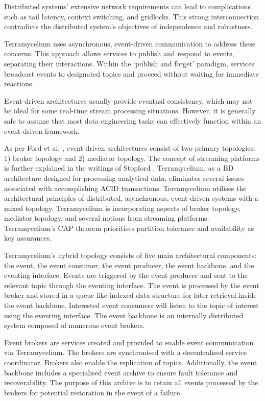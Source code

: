\documentclass{ieeeaccess}
\begin{document}
Distributed systems' extensive network requirements can lead to complications such as tail latency, context switching, and gridlocks. This strong interconnection contradicts the distributed system's objectives of independence and robustness.

Terramycelium uses asynchronous, event-driven communication to address these concerns. This approach allows services to publish and respond to events, separating their interactions. Within the `publish and forget' paradigm, services broadcast events to designated topics and proceed without waiting for immediate reactions.

Event-driven architectures usually provide eventual consistency, which may not be ideal for some real-time stream processing situations. However, it is generally safe to assume that most data engineering tasks can effectively function within an event-driven framework.

As per Ford et al. \cite{Ford2021SoftwareArchitecture}, event-driven architectures consist of two primary topologies: 1) broker topology and 2) mediator topology. The concept of streaming platforms is further explained in the writings of Stopford \cite{stopford2018designing}. Terramycelium, as a BD architecture designed for processing analytical data, eliminates several issues associated with accomplishing ACID transactions. Terramycelium utilises the architectural principles of distributed, asynchronous, event-driven systems with a mixed topology. Terramycelium is incorporating aspects of broker topology, mediator topology, and several notions from streaming platforms. Terramycelium's CAP theorem \cite{simon2000brewer} prioritises partition tolerance and availability as key assurances. 

Terramycelium's hybrid topology consists of five main architectural components: the event, the event consumer, the event producer, the event backbone, and the eventing interface. Events are triggered by the event producer and sent to the relevant topic through the eventing interface. The event is processed by the event broker and stored in a queue-like indexed data structure for later retrieval inside the event backbone. Interested event consumers will listen to the topic of interest using the eventing interface. The event backbone is an internally distributed system composed of numerous event brokers. 

Event brokers are services created and provided to enable event communication via Terramycelium. The brokers are synchronised with a decentralised service coordinator. Brokers also enable the replication of topics. Additionally, the event backbone includes a specialised event archive to ensure fault tolerance and recoverability. The purpose of this archive is to retain all events processed by the brokers for potential restoration in the event of a failure. 
\end{document}
